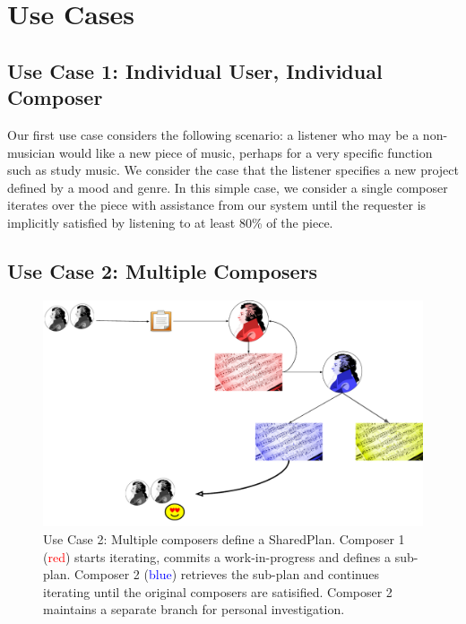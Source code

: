 \documentclass[final,authoryear,5p,times,twocolumn]{elsarticle}
\begin{document}
\section{Use Cases}

\subsection{Use Case 1: Individual User, Individual Composer}

Our first use case considers the following scenario: a listener who may be a non-musician would like a new piece of music, perhaps for a very specific function such as study music. We consider the case that the listener specifies a new project defined by a mood and genre. In this simple case, we consider a single composer iterates over the piece with assistance from our system until the requester is implicitly satisfied by listening to at least 80\% of the piece.

\subsection{Use Case 2: Multiple Composers}

\begin{figure}
	\includegraphics[scale=0.35]{multicomposer.pdf}
	\caption{Use Case 2: Multiple composers define a SharedPlan. Composer 1 (\textcolor{red}{red}) starts
	iterating, commits a work-in-progress and defines a sub-plan. Composer 2 (\textcolor{blue}{blue}) retrieves the sub-plan and continues iterating until the original composers are
	satisified. Composer 2 maintains a separate branch for personal investigation.}
	\label{fig:multicomposer}
\end{figure}

\end{document}
